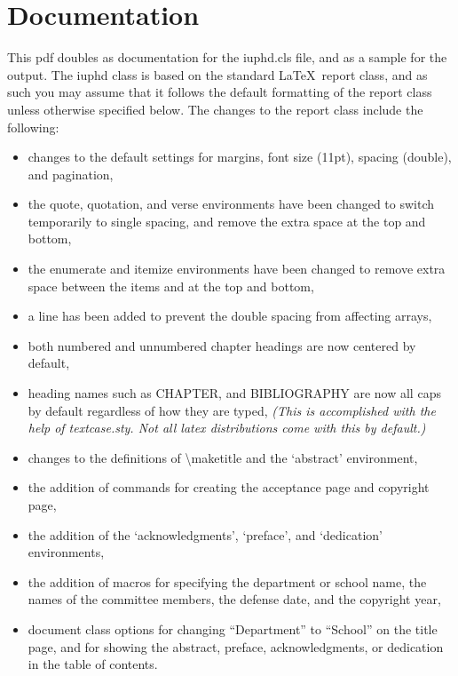 \chapter{Documentation}

This pdf doubles as documentation for the iuphd.cls file, and as a sample for the output.
The iuphd class is based on the standard \LaTeX \ report class, and as such you may assume that it follows
the default formatting of the report class unless otherwise specified below.  The
changes to the report class include the following:

\begin{itemize}
 \item changes to the default settings for margins, font size (11pt), spacing (double), and pagination,
 \item the quote, quotation, and verse environments have been changed to switch temporarily to single spacing, and
       remove the extra space at the top and bottom,
 \item the enumerate and itemize environments have been changed to remove extra space between the items and at the
       top and bottom,
 \item a line has been added to prevent the double spacing from affecting arrays,
 \item both numbered and unnumbered chapter headings are now centered by default,
 \item heading names such as CHAPTER, and BIBLIOGRAPHY are now all caps by default regardless of how they are typed,
 \emph{(This is accomplished with the help of textcase.sty.  Not all latex distributions come with this by default.)}
 \item changes to the definitions of \textbackslash maketitle and the `abstract' environment,
 \item the addition of commands for creating the acceptance page and copyright page,
 \item the addition of the `acknowledgments', `preface', and `dedication' environments,
 \item the addition of macros for specifying the department or school name, the names of
 the committee members, the defense date, and the copyright year,
 \item document class options for changing ``Department'' to ``School'' on the title page, and for showing
 the abstract, preface, acknowledgments, or dedication in the table of contents.
\end{itemize}

